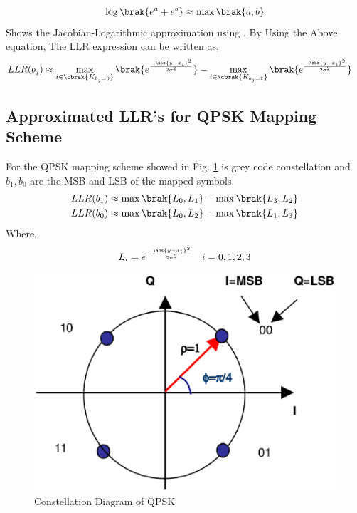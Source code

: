 \documentclass[journal,12pt,twocolumn]{IEEEtran}
\begin{document}
\begin{equation}
\log \brak{e^a+e^b}\approx \max \brak{a,b}
\end{equation}
Shows the Jacobian-Logarithmic approximation using \cite{max-log}.
By Using the Above equation,
The LLR expression can be written as,
\begin{align}
LLR(b_j)&\approx \max_{i\in \cbrak{K_{b_j=0}}}\brak{e^{\frac{-\abs{y-x_i}^2}{2\sigma^2}}} -\max_{i\in \cbrak{K_{b_j=1}}}\brak{e^{\frac{-\abs{y-x_i}^2}{2\sigma^2}}}
\end{align}
\subsection{Approximated LLR's for QPSK Mapping Scheme}
For the QPSK mapping scheme showed in Fig. \ref{fig : qpsk} is grey code constellation and  $b_1,b_0$ are the MSB and LSB of the mapped symbols.
\begin{align}
LLR(b_1)&\approx \max \brak{L_0,L_1} -\max \brak{L_3,L_2} \\
LLR(b_0)&\approx \max \brak{L_0,L_2} -\max \brak{L_1,L_3}
\end{align}
Where,
\begin{align}
L_i = e^{-\frac{\abs{y-x_i}^2}{2\sigma^2}} \quad i=0,1,2,3
\end{align}
\begin{figure}[!ht]
\begin{center}
\includegraphics[width=\columnwidth]{./figs/qpsk}
\caption{Constellation Diagram of QPSK}
\label{fig : qpsk}
\end{center}
\end{figure}
\end{document}
